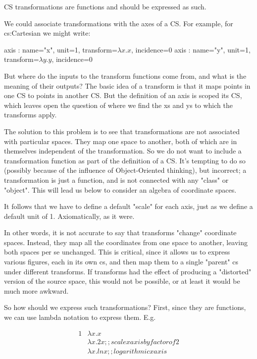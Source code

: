 \documentclass[12pt]{tufte-handout}
\numberwithin{equation}{subsection}
\numberwithin{equation}{subsection}
\begin{document}
{  CS transformations are functions and should be expressed as such.

  We could associate transformations with the axes of a CS.  For
  example, for cs:Cartesian we might write:

  axis : {name="x", unit=1, transform=\(\lambda x.x\), incidence=0}
  axis : {name="y", unit=1, transform=\(\lambda y.y\), incidence=0}

  But where do the inputs to the transform functions come from, and what
  is the meaning of their outputs?  The basic idea of a transform is
  that it maps points in one CS to points in another CS.  But the
  definition of an axis is scoped its CS, which leaves open the question
  of where we find the xs and ys to which the transforms apply.

  The solution to this problem is to see that transformations are not
  associated with particular spaces.  They map one space to another,
  both of which are in themselves independent of the transformation.  So
  we do not want to include a transformation function as part of the
  definition of a CS.  It's tempting to do so (possibly because of the
  influence of Object-Oriented thinking), but incorrect; a
  transformation is just a function, and is not connected with any
  "class" or "object".  This will lead us below to consider an algebra
  of coordinate spaces.

  It follows that we have to define a default "scale" for each axis,
  just as we define a default unit of 1.  Axiomatically, as it were.

  In other words, it is not accurate to say that transforms "change"
  coordinate spaces.  Instead, they map all the coordinates from one
  space to another, leaving both spaces per se unchanged.  This is
  critical, since it allows us to express various figures, each in its
  own cs, and then map them to a single "parent" cs under different
  transforms.  If transforms had the effect of producing a "distorted"
  version of the source space, this would not be possible, or at least
  it would be much more awkward.

  So how should we express such transformations?  First, since they are
  functions, we can use lambda notation to express them.  E.g.

  {
    \begin{alignat}{1}
      & \lambda x.x \\
      & \lambda x.2x   ;; scale x axis by factor of 2 \\
      & \lambda x.ln x ;; logarithmic x axis
    \end{alignat}
  }

}
\end{document}
